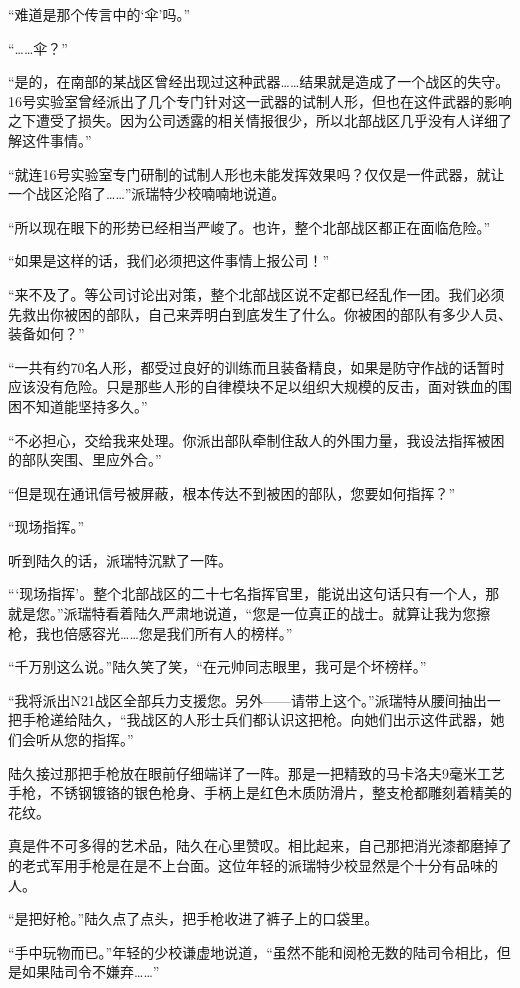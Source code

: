 “难道是那个传言中的‘伞’吗。”

“……伞？”

“是的，在南部的某战区曾经出现过这种武器……结果就是造成了一个战区的失守。16号实验室曾经派出了几个专门针对这一武器的试制人形，但也在这件武器的影响之下遭受了损失。因为公司透露的相关情报很少，所以北部战区几乎没有人详细了解这件事情。”

“就连16号实验室专门研制的试制人形也未能发挥效果吗？仅仅是一件武器，就让一个战区沦陷了……”派瑞特少校喃喃地说道。

“所以现在眼下的形势已经相当严峻了。也许，整个北部战区都正在面临危险。” 

“如果是这样的话，我们必须把这件事情上报公司！”

“来不及了。等公司讨论出对策，整个北部战区说不定都已经乱作一团。我们必须先救出你被困的部队，自己来弄明白到底发生了什么。你被困的部队有多少人员、装备如何？”

“一共有约70名人形，都受过良好的训练而且装备精良，如果是防守作战的话暂时应该没有危险。只是那些人形的自律模块不足以组织大规模的反击，面对铁血的围困不知道能坚持多久。”

“不必担心，交给我来处理。你派出部队牵制住敌人的外围力量，我设法指挥被困的部队突围、里应外合。”

“但是现在通讯信号被屏蔽，根本传达不到被困的部队，您要如何指挥？”

“现场指挥。”

听到陆久的话，派瑞特沉默了一阵。

“‘现场指挥’。整个北部战区的二十七名指挥官里，能说出这句话只有一个人，那就是您。”派瑞特看着陆久严肃地说道，“您是一位真正的战士。就算让我为您擦枪，我也倍感容光……您是我们所有人的榜样。”

“千万别这么说。”陆久笑了笑，“在元帅同志眼里，我可是个坏榜样。”

“我将派出N21战区全部兵力支援您。另外——请带上这个。”派瑞特从腰间抽出一把手枪递给陆久，“我战区的人形士兵们都认识这把枪。向她们出示这件武器，她们会听从您的指挥。”

陆久接过那把手枪放在眼前仔细端详了一阵。那是一把精致的马卡洛夫9毫米工艺手枪，不锈钢镀铬的银色枪身、手柄上是红色木质防滑片，整支枪都雕刻着精美的花纹。

真是件不可多得的艺术品，陆久在心里赞叹。相比起来，自己那把消光漆都磨掉了的老式军用手枪是在是不上台面。这位年轻的派瑞特少校显然是个十分有品味的人。

“是把好枪。”陆久点了点头，把手枪收进了裤子上的口袋里。

“手中玩物而已。”年轻的少校谦虚地说道，“虽然不能和阅枪无数的陆司令相比，但是如果陆司令不嫌弃……”

